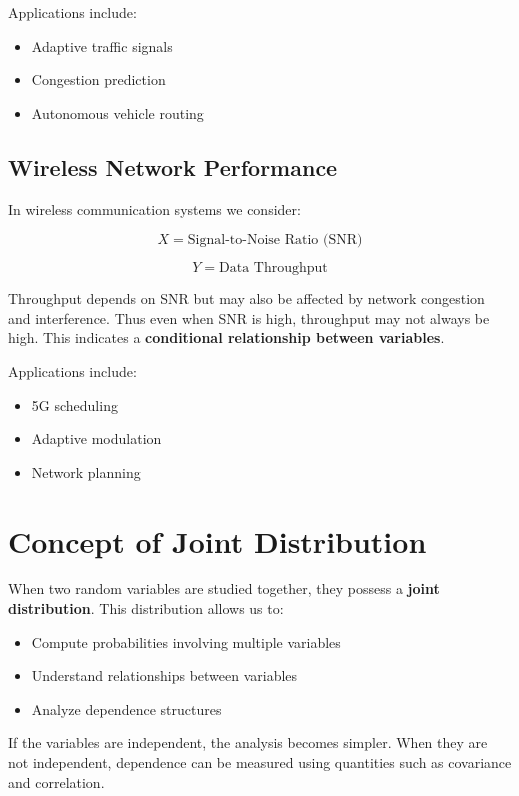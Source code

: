 \documentclass[12pt]{article}
\begin{document}
Applications include:

\begin{itemize}
\item Adaptive traffic signals
\item Congestion prediction
\item Autonomous vehicle routing
\end{itemize}

\subsection{Wireless Network Performance}

In wireless communication systems we consider:

\[
X = \text{Signal-to-Noise Ratio (SNR)}
\]

\[
Y = \text{Data Throughput}
\]

Throughput depends on SNR but may also be affected by network congestion and interference. Thus even when SNR is high, throughput may not always be high. This indicates a \textbf{conditional relationship between variables}.

Applications include:

\begin{itemize}
\item 5G scheduling
\item Adaptive modulation
\item Network planning
\end{itemize}

\section{Concept of Joint Distribution}

When two random variables are studied together, they possess a \textbf{joint distribution}. This distribution allows us to:

\begin{itemize}
\item Compute probabilities involving multiple variables
\item Understand relationships between variables
\item Analyze dependence structures
\end{itemize}

If the variables are independent, the analysis becomes simpler. When they are not independent, dependence can be measured using quantities such as covariance and correlation.
\end{document}
